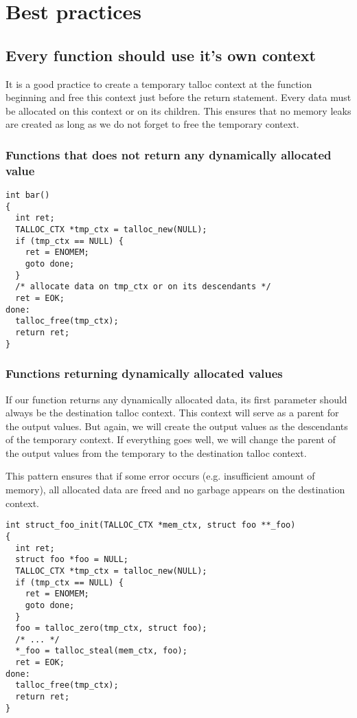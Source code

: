 \section{Best practices}
\label{talloc:sec:best-practices}

\subsection{Every function should use it's own context}
\label{talloc:subsec:function-use-own-context}

It is a good practice to create a temporary talloc context at the function
beginning and free this context just before the return statement. Every data
must be allocated on this context or on its children. This ensures that no
memory leaks are created as long as we do not forget to free the temporary
context.

\subsubsection{Functions that does not return any dynamically allocated value}

\begin{lstlisting}[caption={Temporary context \#1},label=lst:tmp-ctx-1]
int bar()
{
  int ret;
  TALLOC_CTX *tmp_ctx = talloc_new(NULL);
  if (tmp_ctx == NULL) {
    ret = ENOMEM;
    goto done;
  }
  /* allocate data on tmp_ctx or on its descendants */
  ret = EOK;
done:
  talloc_free(tmp_ctx);
  return ret;
}
\end{lstlisting}

\subsubsection{Functions returning dynamically allocated values}

If our function returns any dynamically allocated data, its first parameter
should always be the destination talloc context. This context will serve
as a parent for the output values. But again, we will create the output values
as the descendants of the temporary context. If everything goes well, we will
change the parent of the output values from the temporary to the destination
talloc context.

This pattern ensures that if some error occurs (e.g. insufficient amount of
memory), all allocated data are freed and no garbage appears on the destination
context.

\begin{lstlisting}[caption={Temporary context \#2},label=lst:tmp-ctx-2]
int struct_foo_init(TALLOC_CTX *mem_ctx, struct foo **_foo)
{
  int ret;
  struct foo *foo = NULL;
  TALLOC_CTX *tmp_ctx = talloc_new(NULL);
  if (tmp_ctx == NULL) {
    ret = ENOMEM;
    goto done;
  }
  foo = talloc_zero(tmp_ctx, struct foo);
  /* ... */
  *_foo = talloc_steal(mem_ctx, foo);
  ret = EOK;
done:
  talloc_free(tmp_ctx);
  return ret;
}
\end{lstlisting}

